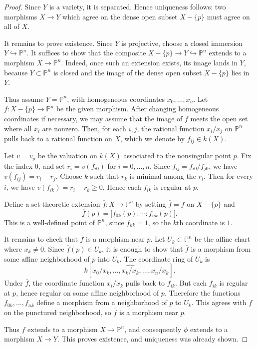 \documentclass[12pt]{article}
\begin{document}
\begin{proof}
    Since $Y$ is a variety, it is separated. Hence uniqueness follows: two morphisms $X\to Y$ which agree on the dense open subset $X-\{p\}$ must agree on all of $X$.

    It remains to prove existence. Since $Y$ is projective, choose a closed immersion $Y\hookrightarrow \mathbb P^n$. It suffices to show that the composite $X-\{p\}\to Y\hookrightarrow \mathbb P^n$ extends to a morphism $X\to \mathbb P^n$. Indeed, once such an extension exists, its image lands in $Y$, because $Y\subset \mathbb P^n$ is closed and the image of the dense open subset $X-\{p\}$ lies in $Y$.

    Thus assume $Y=\mathbb P^n$, with homogeneous coordinates $x_0,\dots,x_n$. Let $f\colon X-\{p\}\to \mathbb P^n$ be the given morphism. After changing homogeneous coordinates if necessary, we may assume that the image of $f$ meets the open set where all $x_i$ are nonzero. Then, for each $i,j$, the rational function $x_i/x_j$ on $\mathbb P^n$ pulls back to a rational function on $X$, which we denote by $f_{ij}\in k(X)$.

    Let $v=v_p$ be the valuation on $k(X)$ associated to the nonsingular point $p$. Fix the index $0$, and set $r_i=v(f_{i0})$ for $i=0,\dots,n$. Since $f_{ij}=f_{i0}/f_{j0}$, we have $v(f_{ij})=r_i-r_j$. Choose $k$ such that $r_k$ is minimal among the $r_i$. Then for every $i$, we have $v(f_{ik})=r_i-r_k\geq 0$. Hence each $f_{ik}$ is regular at $p$.

    Define a set-theoretic extension $\overline f\colon X\to \mathbb P^n$ by setting $\overline f=f$ on $X-\{p\}$ and
    \[
        \overline f(p)=\bigl[f_{0k}(p):\cdots:f_{nk}(p)\bigr].
    \]
    This is a well-defined point of $\mathbb P^n$, since $f_{kk}=1$, so the $k$th coordinate is $1$.

    It remains to check that $\overline f$ is a morphism near $p$. Let $U_k\subset \mathbb P^n$ be the affine chart where $x_k\neq 0$. Since $\overline f(p)\in U_k$, it is enough to show that $\overline f$ is a morphism from some affine neighborhood of $p$ into $U_k$. The coordinate ring of $U_k$ is
    \[
        k[x_0/x_k,\dots,\widehat{x_k/x_k},\dots,x_n/x_k].
    \]
    Under $\overline f$, the coordinate function $x_i/x_k$ pulls back to $f_{ik}$. But each $f_{ik}$ is regular at $p$, hence regular on some affine neighborhood of $p$. Therefore the functions $f_{0k},\dots,f_{nk}$ define a morphism from a neighborhood of $p$ to $U_k$. This agrees with $f$ on the punctured neighborhood, so $\overline f$ is a morphism near $p$.

    Thus $f$ extends to a morphism $X\to \mathbb P^n$, and consequently $\phi$ extends to a morphism $X\to Y$. This proves existence, and uniqueness was already shown.
\end{proof}
\end{document}

